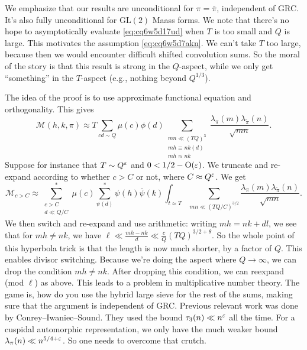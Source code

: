 \documentclass[reqno]{amsart} 
\begin{document}
We emphasize that our results are unconditional for $\pi = \bar{\pi}$, independent of GRC.  It's also fully unconditional for $\mathrm{GL}(2)$ Maass forms.  We note that there's no hope to asymptotically evaluate \eqref{eq:cq6w5d17ud} when $T$ is too small and $Q$ is large.  This motivates the assumption \eqref{eq:cq6w5d7akn}.
We can't take $T$ too large, because then we would encounter difficult shifted convolution sums.  So the moral of the story is that this result is strong in the $Q$-aspect, while we only get ``something'' in the $T$-aspect (e.g., nothing beyond $Q^{1/3}$).

The idea of the proof is to use approximate functional equation and orthogonality.  This gives
\begin{equation*}
  \mathcal{M}(h, k, \pi) \approx T \sum_{c d \sim Q} \mu(c) \phi(d)
  \sum_{
    \substack{
      m n \ll(T Q)^3  \\
      m h \equiv n k(d) \\
      m h \approx n k
    }
  }
  \frac{\lambda_\pi(m) \lambda_{\tilde{\pi}}(n)}{\sqrt{m n}}.
\end{equation*}
Suppose for instance that $T \sim Q^\varepsilon$ and $0 < 1/2 - \operatorname{O}(\varepsilon)$.  We truncate and re-expand according to whether $c > C$ or not, where $C \approx Q^\varepsilon$.  We get
\begin{equation*}
  \mathcal{M}_{c > C} \approx \sum_{
    \substack{
      c > C  \\
      d \ll Q / C      
    }
  }^\ast \mu(c) \sum_{\psi(d)}^\ast \psi(h) \overline{\psi}(k)
  \int_{t \approx T}
  \sum_{m n \ll(T Q / C)^{3/2}}
  \frac{\lambda_\pi(m) \lambda_{\tilde{\pi}}(n)}{\sqrt{m n}}.  
\end{equation*}
We then switch and re-expand and use arithmetic: writing $m h = n k + d l$, we see that for $m h \neq n k$, we have $\ell \ll \frac{m h - n k}{d} \ll \frac{c}{Q}(T Q)^{3/2 + \theta}$.  So the whole point of this hyperbola trick is that the length is now much shorter, by a factor of $Q$.  This enables divisor switching.  Because we're doing the aspect where $Q \rightarrow \infty$, we can drop the condition $m h \neq n k$.  After dropping this condition, we can reexpand (mod $\ell$) as above.  This leads to a problem in multiplicative number theory.  The game is, how do you use the hybrid large sieve for the rest of the sums, making sure that the argument is independent of GRC.  Previous relevant work was done by Conrey--Iwaniec--Sound.  They used the bound $\tau_3(n) \ll n^\varepsilon$ all the time.  For a cuspidal automorphic representation, we only have the much weaker bound $\lambda_\pi(n) \ll n^{5/4 + \varepsilon}$.  So one needs to overcome that crutch.

{} 
\end{document}
